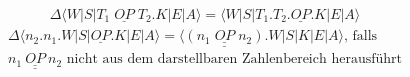 \documentclass[ngerman,a4paper]{report}
\begin{document}
\begin{equation}
\tag{OS4a}
\begin{split}
\Delta\langle W|S|T_1\;\underline{OP}\;T_2.K|E|A\rangle = \langle W|S|T_1.T_2.\underline{OP}.K|E|A\rangle
\end{split}
\label{eqn:os4a}
\end{equation}	
\begin{equation}
\tag{OS4b}
\begin{split}
\Delta\langle n_2.n_1.W|S|\underline{OP}.K|E|A\rangle = \langle \underline{(n_1\;\underline{OP}\;n_2)}.W|S|K|E|A\rangle\text{, falls }\\\underline{n_1\ \underline{OP}\ n_2}\text{ nicht aus dem darstellbaren Zahlenbereich herausführt}
\end{split}
\label{eqn:os4b}
\end{equation}	
\end{document}
